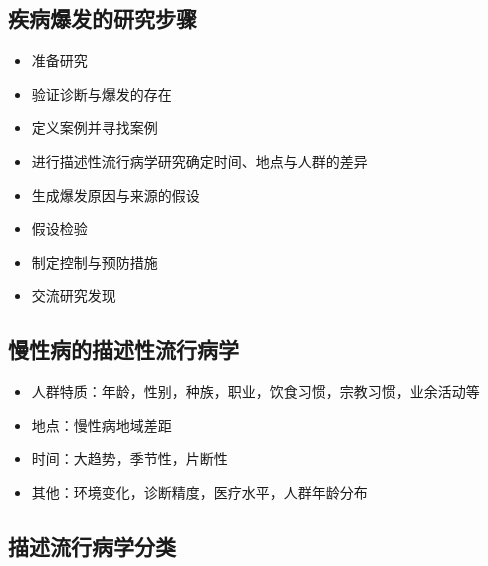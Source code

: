 \documentclass[]{book}
\providecommand{\tightlist}{%
  \setlength{\itemsep}{0pt}\setlength{\parskip}{0pt}}
\begin{document}
\hypertarget{ux75beux75c5ux7206ux53d1ux7684ux7814ux7a76ux6b65ux9aa4}{%
\subsection{疾病爆发的研究步骤}\label{ux75beux75c5ux7206ux53d1ux7684ux7814ux7a76ux6b65ux9aa4}}

\begin{itemize}
\tightlist
\item
  准备研究
\item
  验证诊断与爆发的存在
\item
  定义案例并寻找案例
\item
  进行描述性流行病学研究确定时间、地点与人群的差异
\item
  生成爆发原因与来源的假设
\item
  假设检验
\item
  制定控制与预防措施
\item
  交流研究发现
\end{itemize}

\hypertarget{ux6162ux6027ux75c5ux7684ux63cfux8ff0ux6027ux6d41ux884cux75c5ux5b66}{%
\subsection{慢性病的描述性流行病学}\label{ux6162ux6027ux75c5ux7684ux63cfux8ff0ux6027ux6d41ux884cux75c5ux5b66}}

\begin{itemize}
\tightlist
\item
  人群特质：年龄，性别，种族，职业，饮食习惯，宗教习惯，业余活动等
\item
  地点：慢性病地域差距
\item
  时间：大趋势，季节性，片断性
\item
  其他：环境变化，诊断精度，医疗水平，人群年龄分布
\end{itemize}

\hypertarget{ux63cfux8ff0ux6d41ux884cux75c5ux5b66ux5206ux7c7b}{%
\subsection{描述流行病学分类}\label{ux63cfux8ff0ux6d41ux884cux75c5ux5b66ux5206ux7c7b}}
\end{document}
